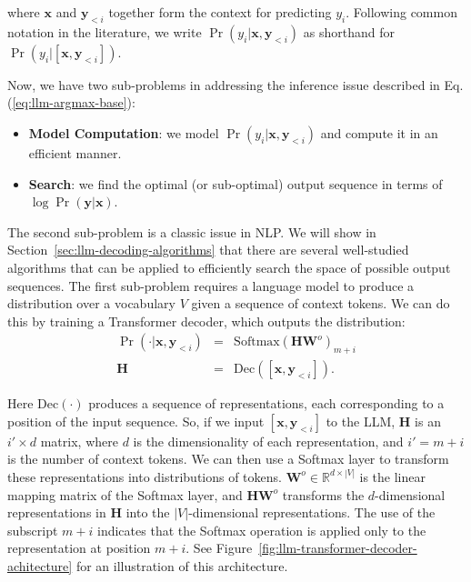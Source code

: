 \noindent where $\mathbf{x}$ and $\mathbf{y}_{<i}$ together form the context for predicting $y_i$. Following common notation in the literature, we write $\Pr(y_i|\mathbf{x},\mathbf{y}_{<i})$ as shorthand for $\Pr(y_i|[\mathbf{x},\mathbf{y}_{<i}])$.

\vspace{0.3em}
Now, we have two sub-problems in addressing the inference issue described in Eq. (\ref{eq:llm-argmax-base}):

\begin{itemize}
\item \vspace{0.3em} \textbf{Model Computation}: we model $\Pr(y_i|\mathbf{x},\mathbf{y}_{<i})$ and compute it in an efficient manner.
\item \vspace{0.3em} \textbf{Search}: we find the optimal (or sub-optimal) output sequence in terms of $\log \Pr(\mathbf{y}|\mathbf{x})$.
\end{itemize}
\vspace{0.3em}

The second sub-problem is a classic issue in NLP. We will show in Section~\ref{sec:llm-decoding-algorithms} that there are several well-studied algorithms that can be applied to efficiently search the space of possible output sequences. The first sub-problem requires a language model to produce a distribution over a vocabulary $V$ given a sequence of context tokens. We can do this by training a Transformer decoder, which outputs the distribution:
\begin{eqnarray}
\Pr(\cdot|\mathbf{x},\mathbf{y}_{<i}) & = & \mathrm{Softmax}(\mathbf{H} \mathbf{W}^{o})_{m+i} \label{eq:llm-token-predic-prob-softmax} \\
\mathbf{H} & = & \mathrm{Dec}([\mathbf{x},\mathbf{y}_{<i}]).
\end{eqnarray}

\noindent Here $\mathrm{Dec}(\cdot)$ produces a sequence of representations, each corresponding to a position of the input sequence. So, if we input $[\mathbf{x},\mathbf{y}_{<i}]$ to the LLM, $\mathbf{H}$ is an $i' \times d$ matrix, where $d$ is the dimensionality of each representation, and $i' = m+i$ is the number of context tokens. We can then use a Softmax layer to transform these representations into distributions of tokens. $\mathbf{W}^{o} \in \mathbb{R}^{d \times |V|}$ is the linear mapping matrix of the Softmax layer, and $\mathbf{H} \mathbf{W}^{o}$ transforms the $d$-dimensional representations in $\mathbf{H}$ into the $|V|$-dimensional representations. The use of the subscript $m+i$ indicates that the Softmax operation is applied only to the representation at position $m+i$. See Figure~\ref{fig:llm-transformer-decoder-achitecture} for an illustration of this architecture.


